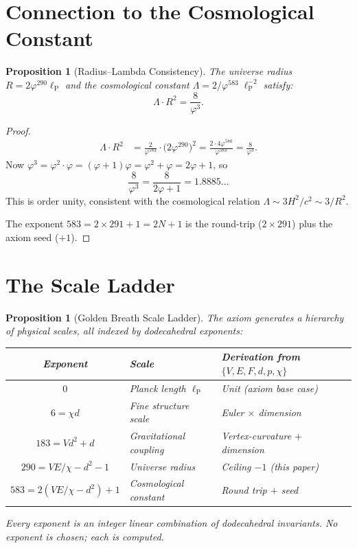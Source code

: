 \documentclass[11pt,a4paper]{article}
\theoremstyle{plain}
\newtheorem{proposition}[theorem]{Proposition}
\theoremstyle{definition}
\newcommand{\lP}{\ell_{\mathrm{P}}}
\newcommand{\vp}{\varphi}
\begin{document}
\section{Connection to the Cosmological Constant}\label{sec:lambda}

\begin{proposition}[Radius--Lambda Consistency]\label{prop:lambda}
The universe radius $R = 2\vp^{290}\lP$ and the cosmological constant
$\Lambda = 2/\vp^{583}\;\lP^{-2}$ satisfy:
\[
  \Lambda \cdot R^2 = \frac{8}{\vp^3}.
\]
\end{proposition}

\begin{proof}
\begin{align*}
  \Lambda \cdot R^2
  &= \frac{2}{\vp^{583}} \cdot \bigl(2\vp^{290}\bigr)^2
  = \frac{2 \cdot 4\vp^{580}}{\vp^{583}}
  = \frac{8}{\vp^3}.
\end{align*}
Now $\vp^3 = \vp^2 \cdot \vp = (\vp + 1)\vp = \vp^2 + \vp = 2\vp + 1$,
so
\[
  \frac{8}{\vp^3} = \frac{8}{2\vp + 1} = 1.8885\ldots
\]
This is order unity, consistent with the cosmological relation
$\Lambda \sim 3H^2/c^2 \sim 3/R^2$.

The exponent $583 = 2 \times 291 + 1 = 2N + 1$ is the round-trip
($2 \times 291$) plus the axiom seed ($+1$).
\end{proof}

\section{The Scale Ladder}\label{sec:ladder}

\begin{proposition}[Golden Breath Scale Ladder]\label{prop:ladder}
The axiom generates a hierarchy of physical scales, all indexed by
dodecahedral exponents:
\begin{center}
\begin{tabular}{@{}cll@{}}
\toprule
Exponent & Scale & Derivation from $\{V,E,F,d,p,\chi\}$ \\
\midrule
$0$ & Planck length $\lP$ & Unit (axiom base case) \\
$6 = \chi d$ & Fine structure scale & Euler $\times$ dimension \\
$183 = Vd^2 + d$ & Gravitational coupling & Vertex-curvature $+$ dimension \\
$290 = VE/\chi - d^2 - 1$ & Universe radius & Ceiling $- 1$ (this paper) \\
$583 = 2(VE/\chi - d^2) + 1$ & Cosmological constant & Round trip $+$ seed \\
\bottomrule
\end{tabular}
\end{center}
Every exponent is an integer linear combination of dodecahedral
invariants.  No exponent is chosen; each is computed.
\end{proposition}
\end{document}
